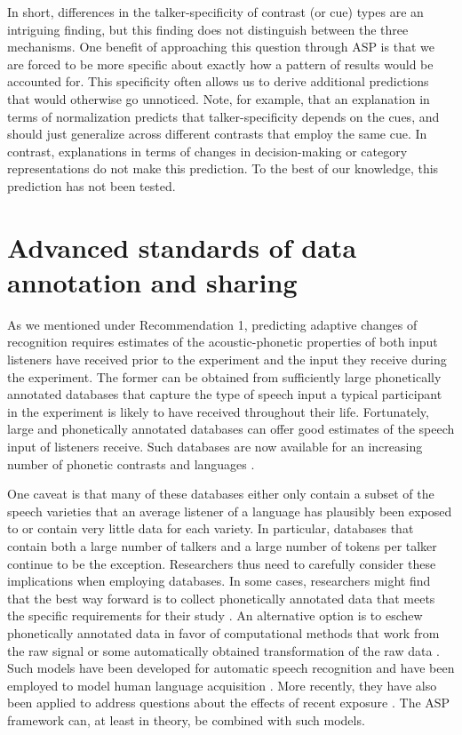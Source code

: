 \documentclass[
  11pt,
  man,floatsintext]{apa6}
\begin{document}
In short, differences in the talker-specificity of contrast (or cue) types are an intriguing finding, but this finding does not distinguish between the three mechanisms. One benefit of approaching this question through ASP is that we are forced to be more specific about exactly how a pattern of results would be accounted for. This specificity often allows us to derive additional predictions that would otherwise go unnoticed. Note, for example, that an explanation in terms of normalization predicts that talker-specificity depends on the cues, and should just generalize across different contrasts that employ the same cue. In contrast, explanations in terms of changes in decision-making or category representations do not make this prediction. To the best of our knowledge, this prediction has not been tested.

\hypertarget{sec:DataSharing}{%
\section{Advanced standards of data annotation and sharing}\label{sec:DataSharing}}

As we mentioned under Recommendation 1, predicting adaptive changes of recognition requires estimates of the acoustic-phonetic properties of both input listeners have received prior to the experiment and the input they receive during the experiment. The former can be obtained from sufficiently large phonetically annotated databases that capture the type of speech input a typical participant in the experiment is likely to have received throughout their life. Fortunately, large and phonetically annotated databases can offer good estimates of the speech input of listeners receive. Such databases are now available for an increasing number of phonetic contrasts and languages \autocites[e.g.,][]{chodroff-wilson2018,clopper-pisoni2006,hillenbrand1995,newman2001,theodore2009}[among many others]{xie-jaeger2020}.

One caveat is that many of these databases either only contain a subset of the speech varieties that an average listener of a language has plausibly been exposed to or contain very little data for each variety. In particular, databases that contain both a large number of talkers and a large number of tokens per talker continue to be the exception. Researchers thus need to carefully consider these implications when employing databases. In some cases, researchers might find that the best way forward is to collect phonetically annotated data that meets the specific requirements for their study \autocites[see][]{mcmurray-jongman2011,persson-jaeger2023,xie2021cognition,tan2021}. An alternative option is to eschew phonetically annotated data in favor of computational methods that work from the raw signal or some automatically obtained transformation of the raw data \autocite[e.g., mel-frequency cepstral coefficients,][]{Mermelstein1976}. Such models have been developed for automatic speech recognition and have been employed to model human language acquisition \autocite{dupoux2018,feldman2013}. More recently, they have also been applied to address questions about the effects of recent exposure \autocite{richter2017}. The ASP framework can, at least in theory, be combined with such models.
\end{document}
